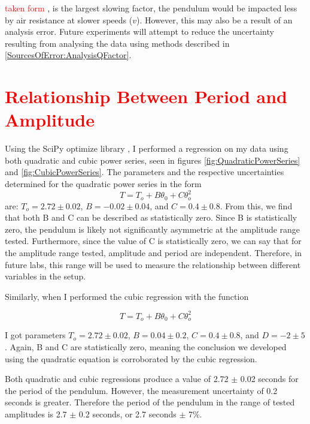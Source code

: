 \documentclass[11pt]{article}
\begin{document}
            \textcolor{red}{taken form \cite{nasa_2015}}, is the largest slowing factor, the pendulum would be impacted less by air resistance at slower speeds ($v$). However, this may also be a result of an analysis error. Future experiments will attempt to reduce the uncertainty resulting from analysing the data using methods described in \ref{SourcesOfError:AnalysisQFactor}.

    \section{\textcolor{red}{Relationship Between Period and Amplitude}}\label{PeriodVsAmp}
        Using the SciPy optimize library \cite{2020SciPy-NMeth}, I performed a regression on my data using both quadratic and cubic power series, seen in figures \ref{fig:QuadraticPowerSeries} and \ref{fig:CubicPowerSeries}. The parameters and the respective uncertainties determined for the quadratic power series in the form 
        \begin{equation}
            T = T_{o} + B\theta_{0} + C\theta_{o}^{2}
        \end{equation}
        are: $T_o = 2.72 \pm 0.02$, $B = -0.02 \pm 0.04$, and $C = 0.4 \pm 0.8$. From this, we find that both B and C can be described as statistically zero. Since B is statistically zero, the pendulum is likely not significantly asymmetric at the amplitude range tested. Furthermore, since the value of C is statistically zero, we can say that for the amplitude range tested, amplitude and period are independent. Therefore, in future labs, this range will be used to measure the relationship between different variables in the setup. 
        
        Similarly, when I performed the cubic regression with the function 
        
        \begin{equation}
            T = T_{o} + B\theta_{0} + C\theta_{o}^{2}
        \end{equation}
        
        I got parameters $T_o = 2.72 \pm 0.02$, $B = 0.04 \pm 0.2$,  $C = 0.4 \pm 0.8$, and $D = -2 \pm 5$. Again, B and C are statistically zero, meaning the conclusion we developed using the quadratic equation is corroborated by the cubic regression.

        Both quadratic and cubic regressions produce a value of 2.72 $\pm$ 0.02 seconds for the period of the pendulum. However, the measurement uncertainty of 0.2 seconds is greater. Therefore the period of the pendulum in the range of tested amplitudes is 2.7 $\pm$ 0.2 seconds, or 2.7 seconds $\pm$ 7\%.
\end{document}
